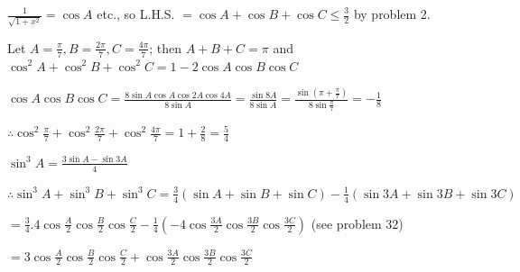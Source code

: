   $\frac{1}{\sqrt{1 + x^2}} = \cos A$ etc., so L.H.S. $= \cos A + \cos B + \cos C \leq \frac{3}{2}$ by problem 2.

\item Let $A = \frac{\pi}{7}, B = \frac{2\pi}{7}, C = \frac{4\pi}{7}$; then $A + B + C = \pi$ and $\cos^2A + \cos^2B +
  \cos^2C = 1 - 2\cos A\cos B\cos C$

  $\cos A\cos B\cos C = \frac{8\sin A\cos A\cos 2A\cos 4A}{8\sin A} = \frac{\sin 8A}{8\sin A} = \frac{\sin(\pi +
    \frac{\pi}{7})}{8\sin\frac{\pi}{7}} = -\frac{1}{8}$

  $\therefore \cos^2\frac{\pi}{7} + \cos^2\frac{2\pi}{7} + \cos^2\frac{4\pi}{7} = 1 + \frac{2}{8} = \frac{5}{4}$

\item $\sin^3A = \frac{3\sin A - \sin 3A}{4}$

  $\therefore \sin^3A + \sin^3B + \sin^3C = \frac{3}{4}(\sin A + \sin B + \sin C) - \frac{1}{4}(\sin 3A + \sin 3B + \sin
  3C)$

  $= \frac{3}{4}.4\cos\frac{A}{2}\cos\frac{B}{2}\cos\frac{C}{2} - \frac{1}{4}\left(-4\cos\frac{3A}{2}\cos\frac{3B}{2}
  \cos\frac{3C}{2}\right)$ (see problem 32)

  $= 3\cos\frac{A}{2}\cos\frac{B}{2}\cos\frac{C}{2} + \cos\frac{3A}{2}\cos\frac{3B}{2}\cos\frac{3C}{2}$
\stopitemize
